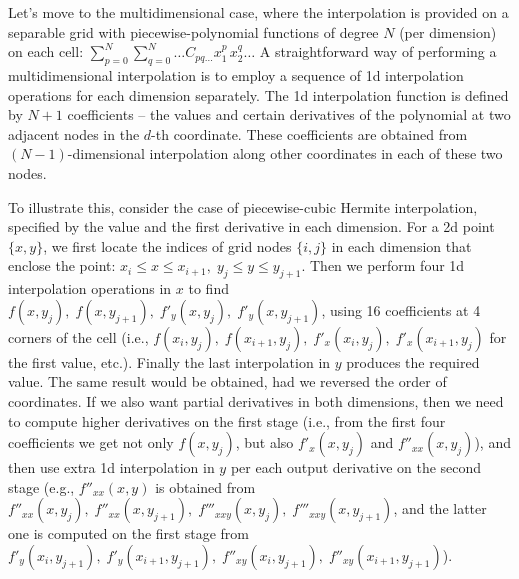 \documentclass[12pt]{article}
\begin{document}
Let's move to the multidimensional case, where the interpolation is provided on a separable grid with piecewise-polynomial functions of degree $N$ (per dimension) on each cell: $\sum_{p=0}^{N}\sum_{q=0}^N\dots C_{pq\dots} x_1^p\,x_2^q\dots$
A straightforward way of performing a multidimensional interpolation is to employ a sequence of 1d interpolation operations for each dimension separately. The 1d interpolation function is defined by $N+1$ coefficients -- the values and certain derivatives of the polynomial at two adjacent nodes in the $d$-th coordinate. These coefficients are obtained from $(N-1)$-dimensional interpolation along other coordinates in each of these two nodes.

To illustrate this, consider the case of piecewise-cubic Hermite interpolation, specified by the value and the first derivative in each dimension. For a 2d point $\{x,y\}$, we first locate the indices of grid nodes $\{i,j\}$ in each dimension that enclose the point: $x_i\le x \le x_{i+1},\; y_j\le y \le y_{j+1}$. Then we perform four 1d interpolation operations in $x$ to find $f(x, y_j),\; f(x, y_{j+1}),\; f'_y(x, y_j),\; f'_y(x, y_{j+1})$, using 16 coefficients at 4 corners of the cell (i.e., $f(x_i,y_j),\; f(x_{i+1},y_j),\; f'_x(x_i,y_j),\; f'_x(x_{i+1},y_j)$ for the first value, etc.). Finally the last interpolation in $y$ produces the required value. The same result would be obtained, had we reversed the order of coordinates. 
If we also want partial derivatives in both dimensions, then we need to compute higher derivatives on the first stage (i.e., from the first four coefficients we get not only $f(x, y_j)$, but also $f'_x(x, y_j)$ and $f''_{xx}(x, y_j)$), and then use extra 1d interpolation in $y$ per each output derivative on the second stage (e.g., $f''_{xx}(x, y)$ is obtained from $f''_{xx}(x, y_j),\; f''_{xx}(x, y_{j+1}),\; f'''_{xxy}(x, y_j),\; f'''_{xxy}(x, y_{j+1})$, and the latter one is computed on the first stage from $f'_y(x_i, y_{j+1}),\; f'_y(x_{i+1}, y_{j+1}),\; f''_{xy}(x_i, y_{j+1}),\; f''_{xy}(x_{i+1}, y_{j+1})$). 
\end{document}
